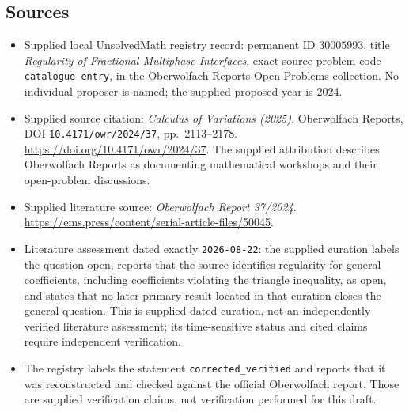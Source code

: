 \documentclass[11pt]{article}
\begin{document}
\subsection{Sources}
\begin{itemize}
\item Supplied local UnsolvedMath registry record: permanent ID \(30005993\), title \emph{Regularity of Fractional Multiphase Interfaces}, exact source problem code \texttt{catalogue entry}, in the Oberwolfach Reports Open Problems collection. No individual proposer is named; the supplied proposed year is 2024.
\item Supplied source citation: \emph{Calculus of Variations (2025)}, Oberwolfach Reports, DOI \texttt{10.4171/owr/2024/37}, pp.\ 2113--2178. \url{https://doi.org/10.4171/owr/2024/37}. The supplied attribution describes Oberwolfach Reports as documenting mathematical workshops and their open-problem discussions.
\item Supplied literature source: \emph{Oberwolfach Report 37/2024}. \url{https://ems.press/content/serial-article-files/50045}.
\item Literature assessment dated exactly \texttt{2026-08-22}: the supplied curation labels the question open, reports that the source identifies regularity for general coefficients, including coefficients violating the triangle inequality, as open, and states that no later primary result located in that curation closes the general question. This is supplied dated curation, not an independently verified literature assessment; its time-sensitive status and cited claims require independent verification.
\item The registry labels the statement \texttt{corrected\_verified} and reports that it was reconstructed and checked against the official Oberwolfach report. Those are supplied verification claims, not verification performed for this draft.
\end{itemize}
\end{document}
